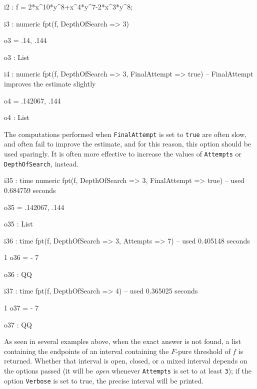 \documentclass{amsart}
\begin{document}
\medskip
{\small
{}
\begin{MyVerbatim}
i2 : f = 2*x^10*y^8+x^4*y^7-2*x^3*y^8;

i3 : numeric fpt(f, DepthOfSearch => 3)

o3 = {.14, .144}

o3 : List

i4 : numeric fpt(f, DepthOfSearch => 3, FinalAttempt => true)
     -- FinalAttempt improves the estimate slightly

o4 = {.142067, .144}

o4 : List
\end{MyVerbatim}
}
\medskip

The computations performed when \texttt{FinalAttempt} is set to \texttt{true} are often slow, and often fail to improve the estimate, and for this reason, this option should be used sparingly. It is often more effective to increase the values of \texttt{Attempts} or \texttt{DepthOfSearch}, instead.

\medskip
{\small
{}
\begin{MyVerbatim}
i35 : time numeric fpt(f, DepthOfSearch => 3, FinalAttempt => true)
     -- used 0.684759 seconds

o35 = {.142067, .144}

o35 : List

i36 : time fpt(f, DepthOfSearch => 3, Attempts => 7) 
     -- used 0.405148 seconds

      1
o36 = -
      7

o36 : QQ

i37 : time fpt(f, DepthOfSearch => 4) 
     -- used 0.365025 seconds

      1
o37 = -
      7

o37 : QQ
\end{MyVerbatim}
}
\medskip

As seen in several examples above, when the exact answer is not found, a list containing the endpoints of an interval containing the $F$-pure threshold of $f$ is returned.
Whether that interval is open, closed, or a mixed interval depends on the options passed (it will be \emph{open} whenever \texttt{Attempts} is set to at least \texttt{3}); if the option \texttt{Verbose} is set to true, the precise interval will be printed.
\end{document}
